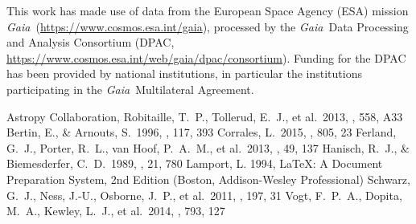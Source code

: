 \documentclass[modern]{aastex62}
\newcommand{\acronym}[1]{{\small{#1}}}
\newcommand{\project}[1]{\textsl{#1}}
\newcommand{\gaia}{\project{Gaia}}
\begin{document}
This work has made use of data from the European Space Agency (ESA) mission
\gaia\ (\url{https://www.cosmos.esa.int/gaia}), processed by the \gaia\ Data
Processing and Analysis Consortium (\acronym{DPAC},
\url{https://www.cosmos.esa.int/web/gaia/dpac/consortium}). Funding for the
\acronym{DPAC}
has been provided by national institutions, in particular the institutions
participating in the \gaia\ Multilateral Agreement.

\begin{thebibliography}{}
 Astropy Collaboration, Robitaille, T.~P., Tollerud, E.~J., et al.\ 2013, \aap, 558, A33 
 Bertin, E., \& Arnouts, S.\ 1996, \aaps, 117, 393 
 Corrales, L.\ 2015, \apj, 805, 23
 Ferland, G.~J., Porter, R.~L., van Hoof, P.~A.~M., et al.\ 2013, \rmxaa, 49, 137
 Hanisch, R.~J., \& Biemesderfer, C.~D.\ 1989, \baas, 21, 780 
 Lamport, L. 1994, LaTeX: A Document Preparation System, 2nd Edition (Boston, Addison-Wesley Professional)
 Schwarz, G.~J., Ness, J.-U., Osborne, J.~P., et al.\ 2011, \apjs, 197, 31  
 Vogt, F.~P.~A., Dopita, M.~A., Kewley, L.~J., et al.\ 2014, \apj, 793, 127  
\end{thebibliography}


\end{document}
